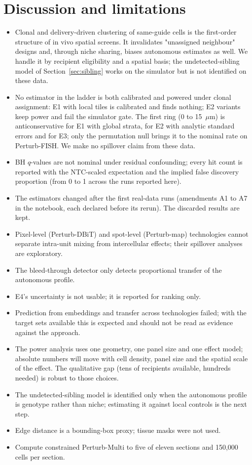 \documentclass[11pt]{article}
\begin{document}
\section{Discussion and limitations}
\label{sec:limits}
\begin{itemize}
\item Clonal and delivery-driven clustering of same-guide cells is the first-order structure
of in vivo spatial screens. It invalidates "unassigned neighbour" designs and, through niche
sharing, biases autonomous estimates as well. We handle it by recipient eligibility and a
spatial basis; the undetected-sibling model of Section~\ref{sec:sibling} works on the
simulator but is not identified on these data.
\item No estimator in the ladder is both calibrated and powered under clonal assignment: E1
with local tiles is calibrated and finds nothing; E2 variants keep power and fail the
simulator gate. The first ring (0 to 15~$\mu$m) is anticonservative for E1 with global strata,
for E2 with analytic standard errors and for E3; only the permutation null brings it to the
nominal rate on Perturb-FISH.
We make no spillover claim from these data.
\item BH $q$-values are not nominal under residual confounding; every hit count is reported
with the NTC-scaled expectation and the implied false discovery proportion (from 0 to 1 across the runs reported here).
\item The estimators changed after the first real-data runs (amendments A1 to A7 in the
notebook, each declared before its rerun). The discarded results are kept.
\item Pixel-level (Perturb-DBiT) and spot-level (Perturb-map) technologies cannot separate
intra-unit mixing from intercellular effects; their spillover analyses are exploratory.
\item The bleed-through detector only detects proportional transfer of the autonomous profile.
\item E4's uncertainty is not usable; it is reported for ranking only.
\item Prediction from embeddings and transfer across technologies failed; with the target sets
available this is expected and should not be read as evidence against the approach.
\item The power analysis uses one geometry, one panel size and one effect model; absolute
numbers will move with cell density, panel size and the spatial scale of the effect. The
qualitative gap (tens of recipients available, hundreds needed) is robust to those choices.
\item The undetected-sibling model is identified only when the autonomous profile is genotype
rather than niche; estimating it against local controls is the next step.
\item Edge distance is a bounding-box proxy; tissue masks were not used.
\item Compute constrained Perturb-Multi to five of eleven sections and 150{,}000 cells per
section.
\end{itemize}
\end{document}
